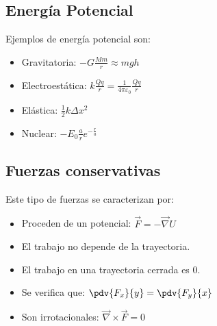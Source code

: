 \documentclass{article}
\begin{document}
\subsection{Energía Potencial}
Ejemplos de energía potencial son:
\begin{itemize}
    \item Gravitatoria: $-G \frac{Mm}{r} \approx mgh$
    \item Electroestática: $k \frac{Qq}{r} = \frac{1}{4 \pi \varepsilon_{0}} \frac{Qq}{r}$
    \item Elástica: $\frac{1}{2} k \Delta x^{2}$
    \item Nuclear: $-E_{0} \frac{a}{r} e^{- \frac{r}{a}}$
\end{itemize}
\subsection{Fuerzas conservativas}
Este tipo de fuerzas se caracterizan por:
\begin{itemize}
    \item Proceden de un potencial: $\vec{F} = - \vec{\nabla  } U$
    \item El trabajo no depende de la trayectoria.
    \item El trabajo en una trayectoria cerrada es $0$.
    \item Se verifica que: $\pdv{F_{x}}{y} = \pdv{F_{y}}{x}$
    \item Son irrotacionales: $\vec{\nabla } \times \vec{F}=0$
\end{itemize}
\end{document}
